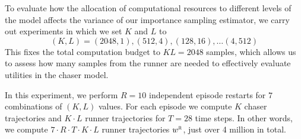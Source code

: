 \documentclass[twoside]{article}
\begin{document}

To evaluate how the allocation of computational resources to different levels of the model affects the variance of our importance sampling estimator, we carry out experiments in which we set $K$ and $L$ to
\[
    (K,L) = (2048,1), (512, 4), (128, 16), \ldots (4,512)
\]
This fixes the total computation budget to $K L = 2048$ samples, which allows us to assess how many samples from the runner are needed to effectively evaluate utilities in the chaser model.

%
In this experiment, we perform $R=10$ independent episode restarts for $7$ combinations of $(K,L)$ values. For each episode we compute $K$ chaser trajectories and $K \cdot L$ runner trajectories for  $T= 28$ time steps. In other words, we compute $7 \cdot R \cdot T \cdot K \cdot L$ runner trajectories $w^{\textsc{r}}$, just over 4 million in total.
\end{document}
